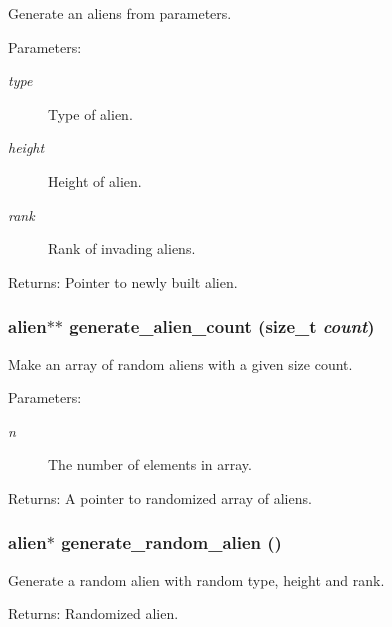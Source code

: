 Generate an aliens from parameters. 

\begin{Desc}
\item[Parameters:]
\begin{description}
\item[{\em type}]Type of alien. \item[{\em height}]Height of alien. \item[{\em rank}]Rank of invading aliens. \end{description}
\end{Desc}
\begin{Desc}
\item[Returns:]Pointer to newly built alien. \end{Desc}
\subsubsection{\setlength{\rightskip}{0pt plus 5cm}\bf{alien}$\ast$$\ast$ generate\_\-alien\_\-count (size\_\-t {\em count})}\label{struct_8h_4abbc00c9d775d15dc685826b02406cc}


Make an array of random aliens with a given size count. 

\begin{Desc}
\item[Parameters:]
\begin{description}
\item[{\em n}]The number of elements in array. \end{description}
\end{Desc}
\begin{Desc}
\item[Returns:]A pointer to randomized array of aliens. \end{Desc}
\subsubsection{\setlength{\rightskip}{0pt plus 5cm}\bf{alien}$\ast$ generate\_\-random\_\-alien ()}\label{struct_8h_dce2ee9ad53436d50ad36034cacaf4b1}


Generate a random alien with random type, height and rank. 

\begin{Desc}
\item[Returns:]Randomized alien. \end{Desc}
